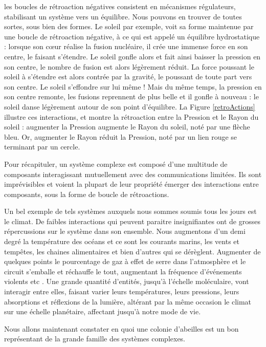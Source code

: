 		les boucles de rétroaction négatives consistent en mécanismes régulateurs, stabilisant un système vers un équilibre. Nous pouvons en trouver de toutes sortes, sous bien des formes. Le soleil par exemple, voit sa forme maintenue par une boucle de rétroaction négative, à ce qui est appelé un équilibre hydrostatique \cite{haubold_analytic_1992} : lorsque son cœur réalise la fusion nucléaire, il crée une immense force en son centre, le faisant s'étendre. Le soleil gonfle alors et fait ainsi baisser la pression en son centre, le nombre de fusion est alors légèrement réduit. La force poussant le soleil à s'étendre est alors contrée par la gravité, le poussant de toute part vers son centre. Le soleil s'effondre sur lui même ! Mais du même temps, la pression en son centre remonte, les fusions reprennent de plus belle et il gonfle à nouveau : le soleil danse légèrement autour de son point d'équilibre. La Figure \ref{retroActions} illustre ces interactions, et montre la rétroaction entre la Pression et le Rayon du soleil : augmenter la Pression augmente le Rayon du soleil, noté par une flèche bleu. Or, augmenter le Rayon réduit la Pression, noté par un lien rouge se terminant par un cercle.
			
			Pour récapituler, un système complexe est composé d'une multitude de composants interagissant mutuellement avec des communications limitées. Ils sont imprévisibles et voient la plupart de leur propriété émerger des interactions entre composants, sous la forme de boucle de rétroactions.
			
			Un bel exemple de tels systèmes auxquels nous sommes soumis tous les jours est le climat. De faibles interactions qui peuvent paraitre insignifiantes ont de grosses répercussions sur le système dans son ensemble. Nous augmentons d'un demi degré la température des océans et ce sont les courants marins, les vents et tempêtes, les chaines alimentaires et bien d'autres qui se dérèglent. Augmenter de quelques points le pourcentage de gaz à effet de serre dans l'atmosphère et le circuit s'emballe et réchauffe le tout, augmentant la fréquence d'événements violents etc \cite{allen_2018_2018}. Une grande quantité d'entités, jusqu'à l'échelle moléculaire, vont interagir entre elles, faisant varier leurs températures, leurs pressions, leurs absorptions et réflexions de la lumière, altérant par la même occasion le climat sur une échelle planétaire, affectant jusqu'à notre mode de vie. 
						
			Nous allons maintenant constater en quoi une colonie d'abeilles est un bon représentant de la grande famille des systèmes complexes.
			
